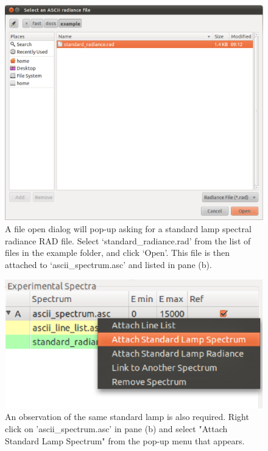 \documentclass[a4paper,12pt]{report}
\begin{document}
\begin{figure}\centering
\includegraphics[scale=0.5]{Tutorial8.eps}
\caption{A file open dialog will pop-up asking for a standard lamp spectral radiance RAD file. Select `standard\_radiance.rad' from the list of files in the example folder, and click `Open'. This file is then attached to `ascii\_spectrum.asc' and listed in pane (b).}
\label{fig:tut8}
\end{figure}

\begin{figure}\centering
\includegraphics[scale=0.5]{Tutorial9.eps}
\caption{An observation of the same standard lamp is also required. Right click on 'ascii\_spectrum.asc' in pane (b) and select "Attach Standard Lamp Spectrum" from the pop-up menu that appears.}
\label{fig:tut9}
\end{figure}
\end{document}
